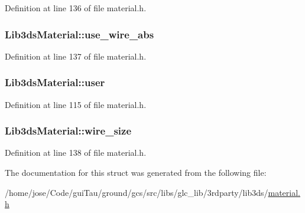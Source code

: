 Definition at line 136 of file material.\-h.

\hypertarget{struct_lib3ds_material_ae3ef7f90ea44e0996ca873b3eb7a5aa5}{
\subsubsection[{use\-\_\-wire\-\_\-abs}]{ Lib3ds\-Material\-::use\-\_\-wire\-\_\-abs}}\label{struct_lib3ds_material_ae3ef7f90ea44e0996ca873b3eb7a5aa5}


Definition at line 137 of file material.\-h.

\hypertarget{struct_lib3ds_material_acb1af2486f89d23df922a1c63d257a70}{
\subsubsection[{user}]{ Lib3ds\-Material\-::user}}\label{struct_lib3ds_material_acb1af2486f89d23df922a1c63d257a70}


Definition at line 115 of file material.\-h.

\hypertarget{struct_lib3ds_material_a8c083879c47f5c4a6055ccbe7167c67b}{
\subsubsection[{wire\-\_\-size}]{ Lib3ds\-Material\-::wire\-\_\-size}}\label{struct_lib3ds_material_a8c083879c47f5c4a6055ccbe7167c67b}


Definition at line 138 of file material.\-h.



The documentation for this struct was generated from the following file\-:\begin{DoxyCompactItemize}
\item 
/home/jose/\-Code/gui\-Tau/ground/gcs/src/libs/glc\-\_\-lib/3rdparty/lib3ds/\hyperlink{material_8h}{material.\-h}\end{DoxyCompactItemize}
